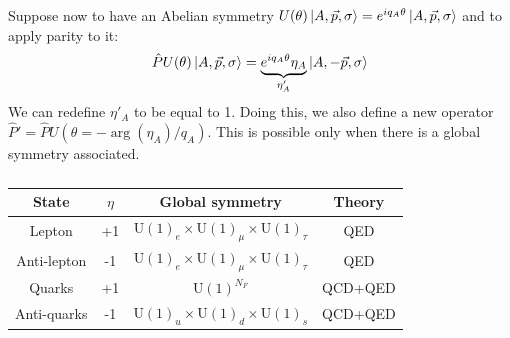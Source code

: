 \documentclass[../main.tex]{subfiles}
\begin{document}
Suppose now to have an Abelian symmetry $U(\theta)\ket{A,\Vec{p},\sigma}=e^{iq_A\theta}\ket{A,\Vec{p},\sigma}$ and to apply parity to it:
\[
\hat{P}U(\theta)\ket{A,\Vec{p},\sigma}=\underbrace{e^{iq_A\theta}\eta_A}_{\eta'_A}\ket{A,-\Vec{p},\sigma}
\]
We can redefine $\eta'_A$ to be equal to 1. Doing this, we also define a new operator $\hat{P}'=\hat{P}U(\theta=-\arg(\eta_A)/q_A)$. This is possible only when there is a global symmetry associated.
\begin{table}[h]
    \centering
    \begin{tabular}{c|c|c|c}
    State & $\eta$ & Global symmetry & Theory\\
    \hline
    Lepton & +1 & U$(1)_e\times$U$(1)_\mu\times$U$(1)_\tau$ & QED\\
    Anti-lepton & -1 & U$(1)_e\times$U$(1)_\mu\times$U$(1)_\tau$ & QED\\
    Quarks & +1 & U$(1)^{N_F}$ & QCD+QED\\
    Anti-quarks & -1 & U$(1)_u\times$U$(1)_d\times$U$(1)_s$ & QCD+QED\\
    \hline
    \end{tabular}
    \caption*{}
    \label{tab:my_label}
\end{table}
\end{document}
